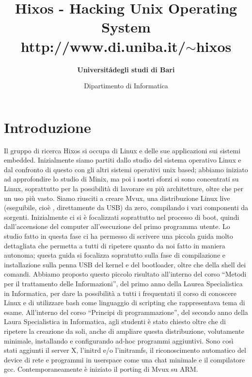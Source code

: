 \documentclass[a4paper,12pt]{article}
\title{\textbf{Hixos} - Hacking Unix Operating System\\http://www.di.uniba.it/$\sim$hixos}
\author{\textbf{Universit\aa degli studi di Bari}}
\date{Dipartimento di Informatica}
\newcommand{\ua }{\`{u} }
\renewcommand{\aa }{\`{a} }
\newcommand{\ea }{\`{e} }
\newcommand{\ia }{\`{i} }
\begin{document}
\maketitle

\section*{Introduzione}
Il gruppo di ricerca Hixos si occupa di Linux e delle sue applicazioni sui sistemi embedded.
Inizialmente siamo partiti dallo studio del sistema operativo Linux e dal confronto di questo con gli altri sistemi operativi unix based; abbiamo iniziato ad approfondire lo studio di Minix, ma poi i nostri sforzi si sono concentrati su Linux, soprattutto per la possibilità di lavorare su pi\ua architetture, oltre che per un uso pi\ua vasto.
Siamo riusciti a creare Mvux, una distribuzione Linux live (eseguibile, cio\ea, direttamente da USB) da zero, compilando i vari componenti da sorgenti.
Inizialmente ci si \ea focalizzati soprattutto nel processo di boot, quindi dall'accensione del computer all'esecuzione del primo programma utente.
Lo studio fatto in questa fase ci ha permesso di scrivere una piccola guida molto dettagliata che permetta a tutti di ripetere quanto da noi fatto in maniera autonoma; questa guida si focalizza sopratutto sulla fase di compilazione e installazione sulla penna USB del kernel e del bootloader, oltre che della shell dei comandi.
Abbiamo proposto questo piccolo risultato all'interno del corso ``Metodi per il trattamento delle Informazioni'', del primo anno della Laurea Specialistica in Informatica, per dare la possibilit\aa a tutti i frequentati il corso di conoscere Linux e di utilizzare bash come linguaggio di scripting che rappresentava tema di esame.
All'interno del corso ``Principi di programmazione'', del secondo anno della Laura Specialistica in Informatica, agli studenti \ea stato chiesto oltre che di ripetere la creazione da soli, anche di ampliare questa distribuzione, volutamente minimale, installando e configurando ad-hoc programmi aggiuntivi.
Sono cos\ia stati aggiunti il server X, l'initrd e/o l'initramfs, il riconoscimento automatico del device di rete e programmi in userspace come una chat minimale e il compilatore gcc.
Contemporaneamente \ea iniziato il porting di Mvux su ARM.
\end{document}
